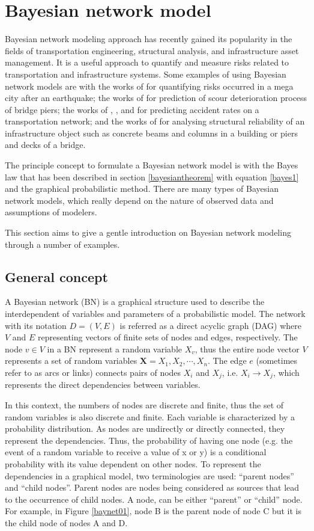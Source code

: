 \section{Bayesian network model}
Bayesian network modeling approach has recently gained its popularity in the fields of transportation engineering, structural analysis, and infrastructure asset management. It is a useful approach to quantify and measure risks related to transportation and infrastructure systems. Some examples of using Bayesian network models are with the works of \cite{Bayraktarli2011} for quantifying risks occurred in a mega city after an earthquake; the works of \cite{Bateni2007} for prediction of scour deterioration process of bridge piers; the works of \cite{Schubert2012}, \cite{Wang2013}, and \cite{Deublein2013} for predicting accident rates on a transportation network; and the works of \cite{Straub2010} for analysing structural reliability of an infrastructure object such as concrete beams and columns in a building or piers and decks of a bridge.

The principle concept to formulate a Bayesian network model is with the Bayes law that has been described in section \ref{bayesiantheorem} with equation \eqref{bayes1} and the graphical probabilistic method. There are many types of Bayesian network models, which really depend on the nature of observed data and assumptions of modelers. 

This section aims to give a gentle introduction on Bayesian network modeling through a number of examples.
\subsection{General concept} \label{baynetconcept}
A Bayesian network (BN) is a graphical structure used to describe the interdependent of variables and parameters of a probabilistic model. The network with its notation $D=(V,E)$ is referred as a direct acyclic graph (DAG) where $V$ and $E$ representing vectors of finite sets of nodes and edges, respectively. The node $v\in V$ in a BN represent a random variable $X_v$, thus the entire node vector $V$ represents a set of random variables $\mathbf  X=X_1,X_2,\cdots,X_n$. The edge $e$ (sometimes refer to as arcs or links) connects pairs of nodes $X_i$ and $X_j$, i.e. $X_i \to X_j$, which represents the direct dependencies between variables. 

In this context, the numbers of nodes are discrete and finite, thus the set of random variables is also discrete and finite. Each variable is characterized by a probability distribution. As nodes are undirectly or directly connected, they represent the dependencies. Thus, the probability of having one node (e.g. the event of a random variable to receive a value of x or y) is a conditional probability with its value dependent on other nodes. To represent the dependencies in a graphical model, two terminologies are used: ``parent nodes'' and ``child nodes''. Parent nodes are nodes being considered as sources that lead to the occurrence of child nodes. A node, can be either ``parent'' or ``child'' node. For example, in Figure \ref{baynet01}, node B is the parent node of node C but it is the child node of nodes A and D.

